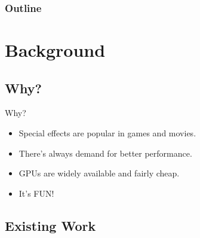 \documentclass[12pt]{beamer}
\begin{document}


\begin{frame}
\frametitle{Outline}
\end{frame}



\section{Background}

\begin{frame}
\end{frame}


\subsection{Why?}

\begin{frame}{Why?}

\begin{itemize}[<+->]
\item Special effects are popular in games and movies. 
\item There's always demand for better performance.
\item GPUs are widely available and fairly cheap.
\item \color{green} It's FUN!
\end{itemize}

\end{frame}


\subsection{Existing Work}
\end{document}
